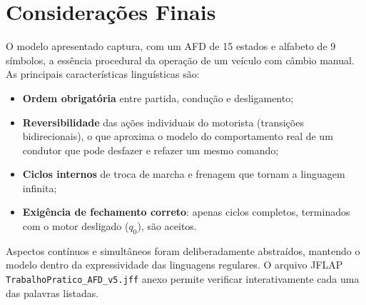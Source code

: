 \documentclass[12pt,a4paper]{article}
\begin{document}
\section{Considerações Finais}

O modelo apresentado captura, com um AFD de 15 estados e alfabeto de 9 símbolos, a essência procedural da operação de um veículo com câmbio manual. As principais características linguísticas são:
\begin{itemize}
    \item \textbf{Ordem obrigatória} entre partida, condução e desligamento;
    \item \textbf{Reversibilidade} das ações individuais do motorista (transições bidirecionais), o que aproxima o modelo do comportamento real de um condutor que pode desfazer e refazer um mesmo comando;
    \item \textbf{Ciclos internos} de troca de marcha e frenagem que tornam a linguagem infinita;
    \item \textbf{Exigência de fechamento correto}: apenas ciclos completos, terminados com o motor desligado ($q_0$), são aceitos.
\end{itemize}
Aspectos contínuos e simultâneos foram deliberadamente abstraídos, mantendo o modelo dentro da expressividade das linguagens regulares. O arquivo JFLAP \texttt{TrabalhoPratico\_AFD\_v5.jff} anexo permite verificar interativamente cada uma das palavras listadas.
\end{document}
